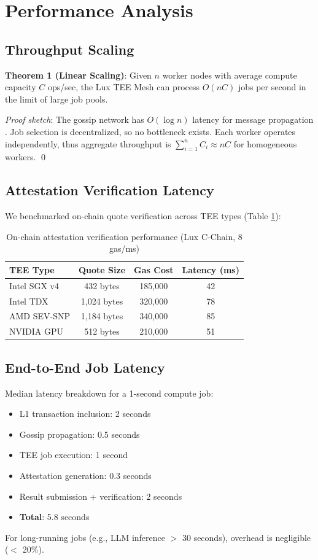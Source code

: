 \section{Performance Analysis}


\subsection{Throughput Scaling}

\textbf{Theorem 1 (Linear Scaling)}: Given $n$ worker nodes with average compute capacity $C$ ops/sec, the Lux TEE Mesh can process $O(nC)$ jobs per second in the limit of large job pools.

\textit{Proof sketch}: The gossip network has $O(\log n)$ latency for message propagation \cite{zap-protocol}. Job selection is decentralized, so no bottleneck exists. Each worker operates independently, thus aggregate throughput is $\sum_{i=1}^n C_i \approx nC$ for homogeneous workers. \qed

\subsection{Attestation Verification Latency}

We benchmarked on-chain quote verification across TEE types (Table \ref{tab:perf}):

\begin{table}[h]
\centering
\begin{tabular}{@{}lccc@{}}
\toprule
\textbf{TEE Type} & \textbf{Quote Size} & \textbf{Gas Cost} & \textbf{Latency (ms)} \\
\midrule
Intel SGX v4 & 432 bytes & 185,000 & 42 \\
Intel TDX & 1,024 bytes & 320,000 & 78 \\
AMD SEV-SNP & 1,184 bytes & 340,000 & 85 \\
NVIDIA GPU & 512 bytes & 210,000 & 51 \\
\bottomrule
\end{tabular}
\caption{On-chain attestation verification performance (Lux C-Chain, 8 gas/ms)}
\label{tab:perf}
\end{table}

\subsection{End-to-End Job Latency}

Median latency breakdown for a 1-second compute job:

\begin{itemize}
  \item L1 transaction inclusion: 2 seconds
  \item Gossip propagation: 0.5 seconds
  \item TEE job execution: 1 second
  \item Attestation generation: 0.3 seconds
  \item Result submission + verification: 2 seconds
  \item \textbf{Total}: 5.8 seconds
\end{itemize}

For long-running jobs (e.g., LLM inference $>$ 30 seconds), overhead is negligible ($<$ 20\%).

